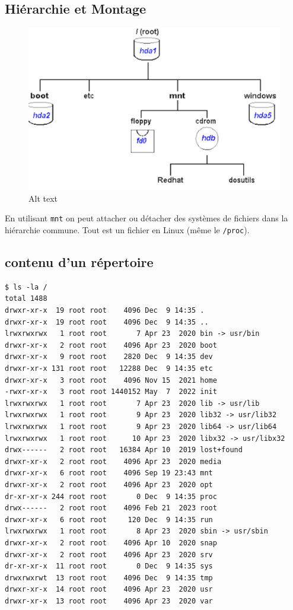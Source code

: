 \subsection{Hiérarchie et Montage}\label{hiuxe9rarchie-et-montage}

\begin{figure}
\centering
\includegraphics{image-34.png}
\caption{Alt text}
\end{figure}

En utilisant \texttt{mnt} on peut attacher ou détacher des systèmes de
fichiers dans la hiérarchie commune. Tout est un fichier en Linux (même
le \texttt{/proc}).

\subsection{contenu d'un répertoire}\label{contenu-dun-ruxe9pertoire}

\begin{verbatim}
$ ls -la / 
total 1488
drwxr-xr-x  19 root root    4096 Dec  9 14:35 .
drwxr-xr-x  19 root root    4096 Dec  9 14:35 ..
lrwxrwxrwx   1 root root       7 Apr 23  2020 bin -> usr/bin
drwxr-xr-x   2 root root    4096 Apr 23  2020 boot
drwxr-xr-x   9 root root    2820 Dec  9 14:35 dev
drwxr-xr-x 131 root root   12288 Dec  9 14:35 etc
drwxr-xr-x   3 root root    4096 Nov 15  2021 home
-rwxr-xr-x   3 root root 1440152 May  7  2022 init
lrwxrwxrwx   1 root root       7 Apr 23  2020 lib -> usr/lib
lrwxrwxrwx   1 root root       9 Apr 23  2020 lib32 -> usr/lib32
lrwxrwxrwx   1 root root       9 Apr 23  2020 lib64 -> usr/lib64
lrwxrwxrwx   1 root root      10 Apr 23  2020 libx32 -> usr/libx32
drwx------   2 root root   16384 Apr 10  2019 lost+found
drwxr-xr-x   2 root root    4096 Apr 23  2020 media
drwxr-xr-x   6 root root    4096 Sep 19 23:43 mnt
drwxr-xr-x   2 root root    4096 Apr 23  2020 opt
dr-xr-xr-x 244 root root       0 Dec  9 14:35 proc
drwx------   2 root root    4096 Feb 21  2023 root
drwxr-xr-x   6 root root     120 Dec  9 14:35 run
lrwxrwxrwx   1 root root       8 Apr 23  2020 sbin -> usr/sbin
drwxr-xr-x   2 root root    4096 Apr 10  2020 snap
drwxr-xr-x   2 root root    4096 Apr 23  2020 srv
dr-xr-xr-x  11 root root       0 Dec  9 14:35 sys
drwxrwxrwt  13 root root    4096 Dec  9 14:35 tmp
drwxr-xr-x  14 root root    4096 Apr 23  2020 usr
drwxr-xr-x  13 root root    4096 Apr 23  2020 var
\end{verbatim}

